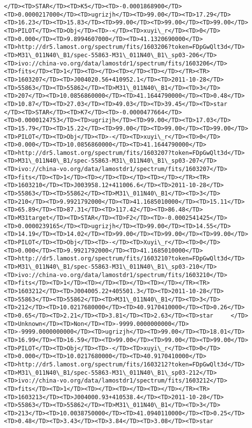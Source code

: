 \documentclass[11pt]{article}
\begin{document}
\begin{Verbatim}[commandchars=\\\{\}]
</TD><TD>STAR</TD><TD>K5</TD><TD>-0.0001868900</TD><TD>0.0000217000</TD><TD>ugrizjh</TD><TD>99.00</TD><TD>17.29</TD><TD>16.23</TD><TD>15.83</TD><TD>99.00</TD><TD>99.00</TD><TD>99.00</TD><TD>PILOT</TD><TD>Obj</TD><TD>-</TD><TD>xuyi\_r</TD><TD>0</TD><TD>0.000</TD><TD>9.8994607000</TD><TD>41.1320690000</TD><TD>http://dr5.lamost.org/spectrum/fits/1603206?token=FDpGwQlt3d</TD><TD>M31\_011N40\_B1/spec-55863-M31\_011N40\_B1\_sp03-206</TD><TD>ivo://china-vo.org/data/lamostdr1/spectrum/fits/1603206</TD><TD>fits</TD><TD>1</TD><TD></TD><TD></TD><TD></TD></TR><TR><TD>1603207</TD><TD>J004020.56+410952.1</TD><TD>2011-10-28</TD><TD>55863</TD><TD>55862</TD><TD>M31\_011N40\_B1</TD><TD>3</TD><TD>207</TD><TD>10.0856860000</TD><TD>41.1644790000</TD><TD>0.48</TD><TD>10.87</TD><TD>27.03</TD><TD>49.03</TD><TD>39.45</TD><TD>star     </TD><TD>STAR</TD><TD>K7</TD><TD>-0.0000477664</TD><TD>0.0000124753</TD><TD>ugrizjh</TD><TD>99.00</TD><TD>17.03</TD><TD>15.79</TD><TD>15.22</TD><TD>99.00</TD><TD>99.00</TD><TD>99.00</TD><TD>PILOT</TD><TD>Obj</TD><TD>-</TD><TD>xuyi\_r</TD><TD>0</TD><TD>0.000</TD><TD>10.0856860000</TD><TD>41.1644790000</TD><TD>http://dr5.lamost.org/spectrum/fits/1603207?token=FDpGwQlt3d</TD><TD>M31\_011N40\_B1/spec-55863-M31\_011N40\_B1\_sp03-207</TD><TD>ivo://china-vo.org/data/lamostdr1/spectrum/fits/1603207</TD><TD>fits</TD><TD>1</TD><TD></TD><TD></TD><TD></TD></TR><TR><TD>1603210</TD><TD>J003958.12+411006.6</TD><TD>2011-10-28</TD><TD>55863</TD><TD>55862</TD><TD>M31\_011N40\_B1</TD><TD>3</TD><TD>210</TD><TD>9.9921792000</TD><TD>41.1685010000</TD><TD>15.11</TD><TD>65.89</TD><TD>87.31</TD><TD>117.42</TD><TD>86.48</TD><TD>M31target</TD><TD>STAR</TD><TD>F2</TD><TD>-0.0002541425</TD><TD>0.0000239165</TD><TD>ugrizjh</TD><TD>99.00</TD><TD>14.55</TD><TD>14.19</TD><TD>14.02</TD><TD>99.00</TD><TD>99.00</TD><TD>99.00</TD><TD>PILOT</TD><TD>Obj</TD><TD>-</TD><TD>Xuyi\_r</TD><TD>0</TD><TD>0.000</TD><TD>9.9921792000</TD><TD>41.1685010000</TD><TD>http://dr5.lamost.org/spectrum/fits/1603210?token=FDpGwQlt3d</TD><TD>M31\_011N40\_B1/spec-55863-M31\_011N40\_B1\_sp03-210</TD><TD>ivo://china-vo.org/data/lamostdr1/spectrum/fits/1603210</TD><TD>fits</TD><TD>1</TD><TD></TD><TD></TD><TD></TD></TR><TR><TD>1603212</TD><TD>J004005.22+405501.3</TD><TD>2011-10-28</TD><TD>55863</TD><TD>55862</TD><TD>M31\_011N40\_B1</TD><TD>3</TD><TD>212</TD><TD>10.0217680000</TD><TD>40.9170410000</TD><TD>0.26</TD><TD>0.65</TD><TD>2.21</TD><TD>3.81</TD><TD>2.63</TD><TD>star     </TD><TD>Unknown</TD><TD>Non</TD><TD>-9999.0000000000</TD><TD>-9999.0000000000</TD><TD>ugrizjh</TD><TD>99.00</TD><TD>18.01</TD><TD>16.99</TD><TD>16.59</TD><TD>99.00</TD><TD>99.00</TD><TD>99.00</TD><TD>PILOT</TD><TD>Obj</TD><TD>-</TD><TD>xuyi\_r</TD><TD>0</TD><TD>0.000</TD><TD>10.0217680000</TD><TD>40.9170410000</TD><TD>http://dr5.lamost.org/spectrum/fits/1603212?token=FDpGwQlt3d</TD><TD>M31\_011N40\_B1/spec-55863-M31\_011N40\_B1\_sp03-212</TD><TD>ivo://china-vo.org/data/lamostdr1/spectrum/fits/1603212</TD><TD>fits</TD><TD>1</TD><TD></TD><TD></TD><TD></TD></TR><TR><TD>1603213</TD><TD>J004000.93+410538.4</TD><TD>2011-10-28</TD><TD>55863</TD><TD>55862</TD><TD>M31\_011N40\_B1</TD><TD>3</TD><TD>213</TD><TD>10.0038750000</TD><TD>41.0940110000</TD><TD>0.25</TD><TD>0.48</TD><TD>3.43</TD><TD>3.84</TD><TD>3.08</TD><TD>star     
\end{Verbatim}
\end{document}
